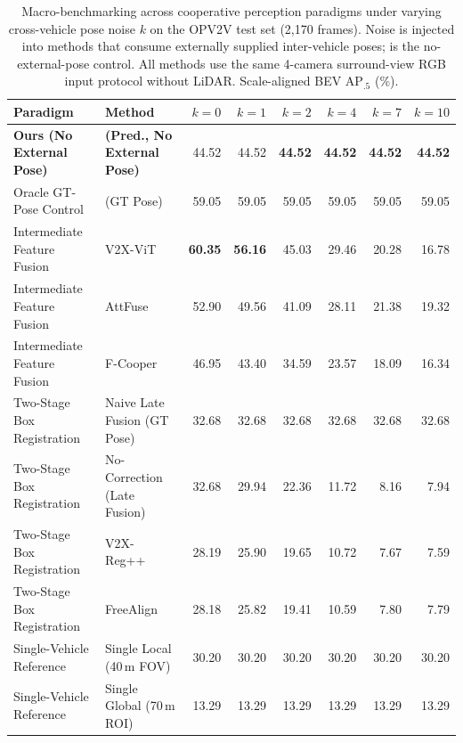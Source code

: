 \begin{table}[t]
\centering\small
\setlength{\tabcolsep}{4.8pt}
\caption{Macro-benchmarking across cooperative perception paradigms under varying cross-vehicle pose noise $k$ on the OPV2V test set (2,170 frames). Noise is injected into methods that consume externally supplied inter-vehicle poses; \method{} is the no-external-pose control. All methods use the same 4-camera surround-view RGB input protocol without LiDAR. Scale-aligned BEV AP$_{.5}$ (\%).}
\label{tab:robustness}
\begin{tabular}{llrrrrrr}\toprule
Paradigm & Method & $k=0$ & $k=1$ & $k=2$ & $k=4$ & $k=7$ & $k=10$\\\midrule
\textbf{Ours (No External Pose)} & \textbf{\method{} (Pred., No External Pose)} & 44.52 & 44.52 & \textbf{44.52} & \textbf{44.52} & \textbf{44.52} & \textbf{44.52}\\
Oracle GT-Pose Control & \method{} (GT Pose) & 59.05 & 59.05 & 59.05 & 59.05 & 59.05 & 59.05\\\midrule
Intermediate Feature Fusion & V2X-ViT~\cite{v2xvit} & \textbf{60.35} & \textbf{56.16} & 45.03 & 29.46 & 20.28 & 16.78\\
Intermediate Feature Fusion & AttFuse~\cite{opv2v} & 52.90 & 49.56 & 41.09 & 28.11 & 21.38 & 19.32\\
Intermediate Feature Fusion & F-Cooper~\cite{fcooper} & 46.95 & 43.40 & 34.59 & 23.57 & 18.09 & 16.34\\\midrule
Two-Stage Box Registration & Naive Late Fusion (GT Pose) & 32.68 & 32.68 & 32.68 & 32.68 & 32.68 & 32.68\\
Two-Stage Box Registration & No-Correction (Late Fusion) & 32.68 & 29.94 & 22.36 & 11.72 & 8.16 & 7.94\\
Two-Stage Box Registration & V2X-Reg++~\cite{v2xreg} & 28.19 & 25.90 & 19.65 & 10.72 & 7.67 & 7.59\\
Two-Stage Box Registration & FreeAlign~\cite{freealign} & 28.18 & 25.82 & 19.41 & 10.59 & 7.80 & 7.79\\\midrule
Single-Vehicle Reference & Single Local (40\,m FOV) & 30.20 & 30.20 & 30.20 & 30.20 & 30.20 & 30.20\\
Single-Vehicle Reference & Single Global (70\,m ROI) & 13.29 & 13.29 & 13.29 & 13.29 & 13.29 & 13.29\\\bottomrule
\end{tabular}
\end{table}

